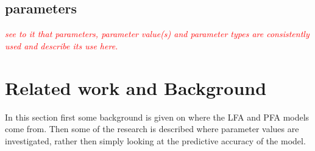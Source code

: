 \documentclass{scrartcl}
\newcommand\todo[1]{\textit{\textcolor{red}{#1}}}
\begin{document}

\subsection{parameters}
\todo{see to it that parameters, parameter value(s) and parameter types are consistently used and describe its use here.}

\section{Related work and Background}
\label{sec:RW}
In this section first some background is given on where the LFA and PFA models come from. Then some of the research is described where parameter values are investigated, rather then simply looking at the predictive accuracy of the model. 
\end{document}
